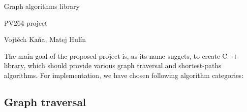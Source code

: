 \documentclass{article}
\begin{document}
\huge
\begin{center}
Graph algorithms library

\vspace{10pt}
\large
PV264 project
\vspace{10pt}

\normalsize
\foreignlanguage{czech}{Vojtěch Kaňa, Matej Hulín}
\vspace{20pt}
\end{center}

\normalsize

The main goal of the proposed project is, as its name suggets, to create C++ library, which should provide various graph traversal and shortest-paths algorithms. For implementation, we have chosen following algorithm categories:

\subsection*{Graph traversal}
\end{document}
